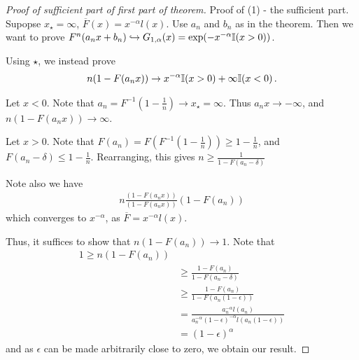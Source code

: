 \begin{proof}[Proof of sufficient part of first part of theorem]
  Proof of (1) - the sufficient part.  Supopse $x_{\star} = \infty$,
  $\overline F(x) = x^{-\alpha} l(x)$.  Use $a_{n}$ and $b_{n}$ as in
  the theorem.  Then we want to prove $F^{n}(a_{n} x + b_{n})
  \hookrightarrow G_{1, \alpha}(x) = \exp(-x^{-\alpha} \I{x > 0})$.  

  Using $\star$, we instead prove
  \begin{align}
    \label{eq:127}
    n(1 - F(a_{n} x)) \rightarrow x^{-\alpha} \I{x > 0} + \infty \I{x
      < 0}.
  \end{align}

  Let $x < 0$.  Note that $a_{n} = F^{-1}(1 - \frac{1}{n}) \rightarrow
  x_{\star} = \infty$.  Thus $a_{n} x \rightarrow - \infty$, and $n(1
  - F(a_{n} x)) \rightarrow \infty$.

  Let $x > 0$. Note that $F(a_{n}) = F(F^{-1}(1 - \frac{1}{n})) \geq 1
  - \frac{1}{n}$, and $F(a_{n} - \delta) \leq 1 - \frac{1}{n}$.
  Rearranging, this gives $n \geq \frac{1}{1 - F(a_{n} - \delta)}$

  Note also we have
  \begin{align}
    \label{eq:128}
    n \frac{(1-F(a_{n} x))}{(1 - F(a_{n} x))} (1 - F(a_{n}))
  \end{align}
  which converges to $x^{-\alpha}$, as $\overline F = x^{-\alpha} l(x)$.

  Thus, it suffices to show that $n(1 - F(a_{n})) \rightarrow 1$.
  Note that
  \begin{align}
    \label{eq:129}
    1 \geq n(1 - F(a_{n})) \\
    &\geq \frac{1-F(a_{n})}{1 - F(a_{n} - \delta)} \\
    &\geq \frac{1 - F(a_{n})}{1 - F(a_{n}(1 - \epsilon))}  \\
    &= \frac{a_{n}^{-\alpha} l(a_{n})}{a_{n}^{-\alpha}
      (1-\epsilon)^{-\alpha}l(a_{n}(1 - \epsilon))} \\
    &= (1 - \epsilon)^{\alpha}
  \end{align}
  and as $\epsilon$ can be made arbitrarily close to zero, we obtain
  our result.
\end{proof}

